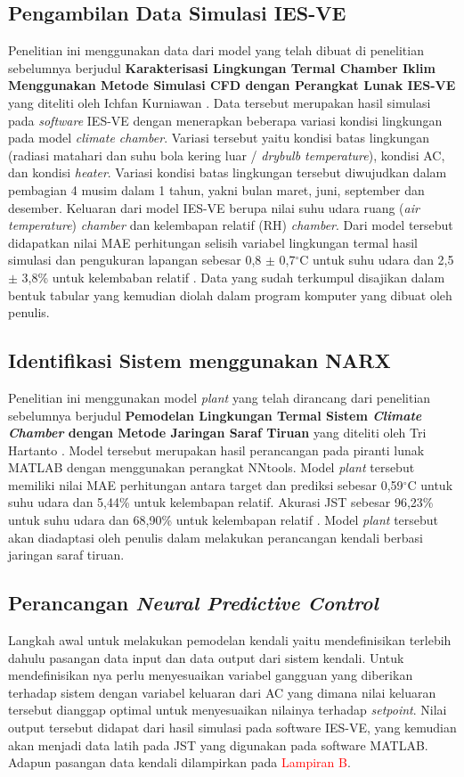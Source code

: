 \subsection{Pengambilan Data Simulasi IES-VE}
Penelitian ini menggunakan data dari model yang telah dibuat di penelitian sebelumnya berjudul \textbf{Karakterisasi Lingkungan Termal Chamber Iklim Menggunakan Metode Simulasi CFD dengan Perangkat Lunak IES-VE} yang diteliti oleh Ichfan Kurniawan \cite{skripsiIchfan}.  Data tersebut merupakan hasil simulasi pada \textit{software} IES-VE dengan menerapkan beberapa variasi kondisi lingkungan pada model \textit{climate chamber}. Variasi tersebut yaitu kondisi batas lingkungan (radiasi matahari dan suhu bola kering luar / \textit{drybulb temperature}), kondisi AC, dan kondisi \textit{heater}. Variasi kondisi batas lingkungan tersebut diwujudkan dalam pembagian 4 musim dalam 1 tahun, yakni bulan maret, juni, september dan desember. Keluaran dari model IES-VE berupa nilai suhu udara ruang (\textit{air temperature}) \textit{chamber} dan kelembapan relatif (RH) \textit{chamber}. Dari model tersebut didapatkan nilai MAE perhitungan selisih variabel lingkungan termal hasil simulasi dan pengukuran lapangan sebesar 0,8 $\pm$ 0,7$^{\circ}$C untuk suhu udara dan 2,5 $\pm$ 3,8\% untuk kelembaban relatif \cite{skripsiIchfan}. Data yang sudah terkumpul disajikan dalam bentuk tabular yang kemudian diolah dalam program komputer yang dibuat oleh penulis.

\subsection{Identifikasi Sistem menggunakan NARX}
Penelitian ini menggunakan model \textit{plant} yang telah dirancang dari penelitian sebelumnya berjudul \textbf{Pemodelan Lingkungan Termal Sistem \textit{Climate Chamber} dengan Metode Jaringan Saraf Tiruan} yang diteliti oleh Tri Hartanto \cite{skripsiTanto}. Model tersebut merupakan hasil perancangan pada piranti lunak MATLAB dengan menggunakan perangkat NNtools. Model \textit{plant} tersebut memiliki nilai MAE perhitungan antara target dan prediksi sebesar 0,59$^{\circ}$C untuk suhu udara dan 5,44\% untuk kelembapan relatif. Akurasi JST sebesar 96,23\% untuk suhu udara dan 68,90\% untuk kelembapan relatif \cite{skripsiTanto}. Model \textit{plant} tersebut akan diadaptasi oleh penulis dalam melakukan perancangan kendali berbasi jaringan saraf tiruan.

\subsection{Perancangan \textit{Neural Predictive Control}}
Langkah awal untuk melakukan pemodelan kendali yaitu mendefinisikan terlebih dahulu pasangan data input dan data output dari sistem kendali. Untuk mendefinisikan nya perlu menyesuaikan variabel gangguan yang diberikan terhadap sistem dengan variabel keluaran dari AC yang dimana nilai keluaran tersebut dianggap optimal untuk menyesuaikan nilainya terhadap \textit{setpoint}. Nilai output tersebut didapat dari hasil simulasi pada software IES-VE, yang kemudian akan menjadi data latih pada JST yang digunakan pada software MATLAB. Adapun pasangan data kendali dilampirkan pada \textcolor{red}{Lampiran B}.

